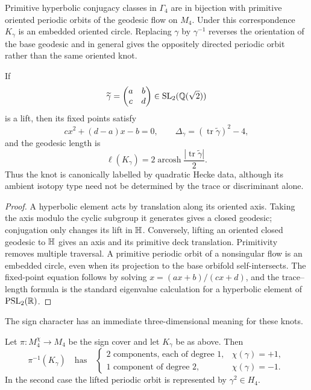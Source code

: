 \begin{proposition}
\label{prop:q4-hyperbolic-class-knot}
Primitive hyperbolic conjugacy classes in \(\Gamma_4\) are in bijection with
primitive oriented periodic orbits of the geodesic flow on \(M_4\).  Under this
correspondence \(K_\gamma\) is an embedded oriented circle.  Replacing
\(\gamma\) by \(\gamma^{-1}\) reverses the orientation of the base geodesic and
in general gives the oppositely directed periodic orbit rather than the same
oriented knot.

If
\[
 \widetilde\gamma=
 \begin{pmatrix}a&b\\c&d\end{pmatrix}
 \in\operatorname{SL}_2(\mathbb{Q}(\sqrt2))
\]
is a lift, then its fixed points satisfy
\begin{equation}
 cx^2+(d-a)x-b=0,
 \qquad
 \Delta_\gamma=(\operatorname{tr}\widetilde\gamma)^2-4,
 \label{eq:q4-axis-quadratic-data}
\end{equation}
and the geodesic length is
\begin{equation}
 \ell(K_\gamma)
 =2\operatorname{arcosh}
 \frac{|\operatorname{tr}\widetilde\gamma|}{2}.
 \label{eq:q4-geodesic-length-trace}
\end{equation}
Thus the knot is canonically labelled by quadratic Hecke data, although its
ambient isotopy type need not be determined by the trace or discriminant alone.
\end{proposition}

\begin{proof}
A hyperbolic element acts by translation along its oriented axis.  Taking the
axis modulo the cyclic subgroup it generates gives a closed geodesic; conjugation
only changes its lift in \(\mathbb{H}\).  Conversely, lifting an oriented closed geodesic
to \(\mathbb{H}\) gives an axis and its primitive deck translation.  Primitivity removes
multiple traversal.  A primitive periodic orbit of a nonsingular flow is an
embedded circle, even when its projection to the base orbifold self-intersects.
The fixed-point equation follows by solving
\(x=(ax+b)/(cx+d)\), and the trace--length formula is the standard eigenvalue
calculation for a hyperbolic element of \(\operatorname{PSL}_2(\mathbb{R})\).
\end{proof}

The sign character has an immediate three-dimensional meaning for these knots.

\begin{proposition}
\label{prop:q4-sign-controlled-knot-lift}
Let \(\pi:M_4^\chi\to M_4\) be the sign cover and let \(K_\gamma\) be as above.
Then
\[
 \pi^{-1}(K_\gamma)
 \quad\text{has}\quad
 \begin{cases}
 2\text{ components, each of degree }1,&\chi(\gamma)=+1,\\
 1\text{ component of degree }2,&\chi(\gamma)=-1.
 \end{cases}
\]
In the second case the lifted periodic orbit is represented by
\(\gamma^2\in H_4\).
\end{proposition}

